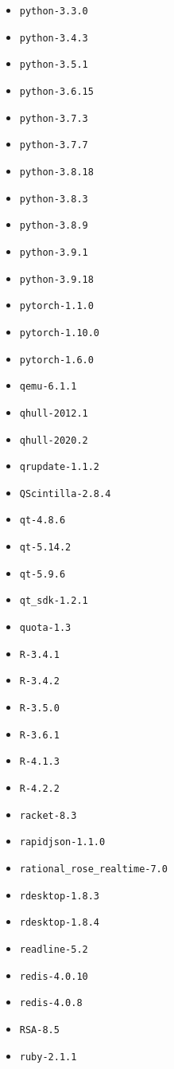 \begin{itemize}
\item \verb|python-3.3.0|
\item \verb|python-3.4.3|
\item \verb|python-3.5.1|
\item \verb|python-3.6.15|
\item \verb|python-3.7.3|
\item \verb|python-3.7.7|
\item \verb|python-3.8.18|
\item \verb|python-3.8.3|
\item \verb|python-3.8.9|
\item \verb|python-3.9.1|
\item \verb|python-3.9.18|
\item \verb|pytorch-1.1.0|
\item \verb|pytorch-1.10.0|
\item \verb|pytorch-1.6.0|
\item \verb|qemu-6.1.1|
\item \verb|qhull-2012.1|
\item \verb|qhull-2020.2|
\item \verb|qrupdate-1.1.2|
\item \verb|QScintilla-2.8.4|
\item \verb|qt-4.8.6|
\item \verb|qt-5.14.2|
\item \verb|qt-5.9.6|
\item \verb|qt_sdk-1.2.1|
\item \verb|quota-1.3|
\item \verb|R-3.4.1|
\item \verb|R-3.4.2|
\item \verb|R-3.5.0|
\item \verb|R-3.6.1|
\item \verb|R-4.1.3|
\item \verb|R-4.2.2|
\item \verb|racket-8.3|
\item \verb|rapidjson-1.1.0|
\item \verb|rational_rose_realtime-7.0|
\item \verb|rdesktop-1.8.3|
\item \verb|rdesktop-1.8.4|
\item \verb|readline-5.2|
\item \verb|redis-4.0.10|
\item \verb|redis-4.0.8|
\item \verb|RSA-8.5|
\item \verb|ruby-2.1.1|

\end{itemize}
